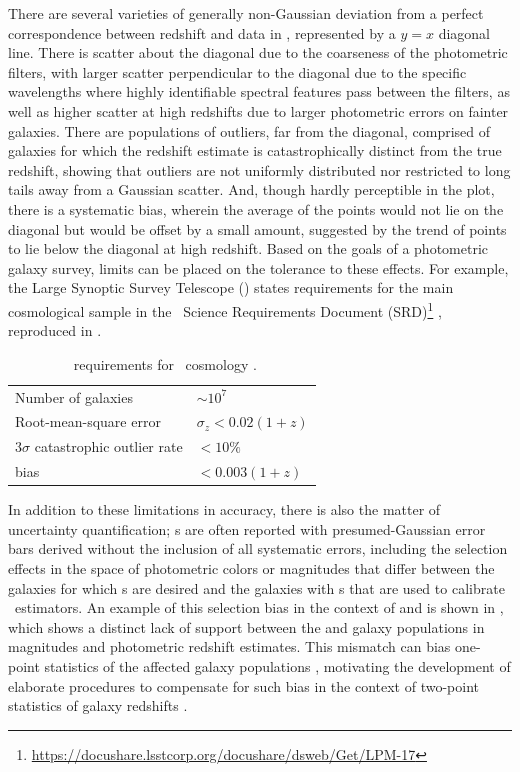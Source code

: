 There are several varieties of generally non-Gaussian deviation from a perfect correspondence between redshift and data in , represented by a $y = x$ diagonal line.
There is scatter about the diagonal due to the coarseness of the photometric filters, with larger scatter perpendicular to the diagonal due to the specific wavelengths where highly identifiable spectral features pass between the filters, as well as higher scatter at high redshifts due to larger photometric errors on fainter galaxies.
There are populations of outliers, far from the diagonal, comprised of galaxies for which the redshift estimate is catastrophically distinct from the true redshift, showing that outliers are not uniformly distributed nor restricted to long tails away from a Gaussian scatter.
And, though hardly perceptible in the plot, there is a systematic bias, wherein the average of the points would not lie on the diagonal but would be offset by a small amount, suggested by the trend of points to lie below the diagonal at high redshift.
Based on the goals of a photometric galaxy survey, limits can be placed on the tolerance to these effects.
For example, the Large Synoptic Survey Telescope (\lsst) states requirements for the main cosmological sample in the \lsst\ Science Requirements Document (SRD)\footnote{\url{https://docushare.lsstcorp.org/docushare/dsweb/Get/LPM-17}} \citep{Mandelbaum:2018}, reproduced in .

\begin{table}
	\begin{center}
		\caption{\Pz\ requirements for \lsst\ cosmology \citep{Mandelbaum:2018}.}
	\begin{tabular}{ll}
		Number of galaxies & $\sim 10^{7}$\\
		Root-mean-square error & $\sigma_z < 0.02 (1 + z)$\\
		$3 \sigma$ catastrophic outlier rate & $< 10\%$\\
		bias & $< 0.003 (1 + z)$
	\end{tabular}
	\end{center}
\end{table}

In addition to these limitations in accuracy, there is also the matter of uncertainty quantification; \pz s are often reported with presumed-Gaussian error bars derived without the inclusion of all systematic errors, including the selection effects in the space of photometric colors or magnitudes that differ between the galaxies for which \pz s are desired and the galaxies with \sz s that are used to calibrate \pz\ estimators.
An example of this selection bias in the context of  \citep{lilly_zcosmos_2009} and  \citep{laigle_cosmos2015_2016} is shown in , which shows a distinct lack of support between the  and  galaxy populations in magnitudes and photometric redshift estimates.
This mismatch can bias one-point statistics of the affected galaxy populations \citep{moresco_spot_2013}, motivating the development of elaborate procedures to compensate for such bias in the context of two-point statistics of galaxy redshifts \citep{mandelbaum_precision_2008}.

